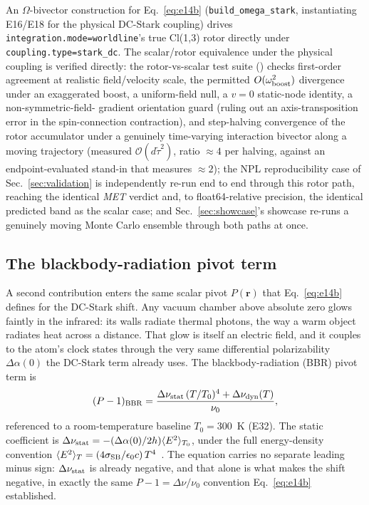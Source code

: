\documentclass[aps,pra,superscriptaddress,groupedaddress,nofootinbib]{revtex4-2}
\begin{document}
An $\Omega$-bivector construction for Eq.~\eqref{eq:e14b}
(\texttt{build\_omega\_stark}, instantiating E16/E18 for the physical
DC-Stark coupling) drives \texttt{integration.mode=worldline}'s true
Cl(1,3) rotor directly under \texttt{coupling.type=stark\_dc}. The
scalar/rotor equivalence under the physical coupling is verified
directly: the rotor-vs-scalar test suite
() checks first-order
agreement at realistic field/velocity scale, the permitted
$O(\omega_{\rm boost}^2)$ divergence under an exaggerated boost, a
uniform-field null, a $v=0$ static-node identity, a non-symmetric-field-
gradient orientation guard (ruling out an axis-transposition error in the
spin-connection contraction), and step-halving convergence of the rotor
accumulator under a genuinely time-varying interaction bivector along a
moving trajectory (measured $\mathcal{O}(d\tilde\tau^2)$, ratio
$\approx4$ per halving, against an endpoint-evaluated stand-in that
measures $\approx2$); the NPL reproducibility case of
Sec.~\ref{sec:validation} is independently re-run end to end through this
rotor path, reaching the identical \textit{MET} verdict and, to float64-relative
precision, the identical predicted band as the scalar case; and
Sec.~\ref{sec:showcase}'s showcase re-runs a genuinely moving Monte Carlo
ensemble through both paths at once.

\subsection{The blackbody-radiation pivot term}
\label{sec:bbr-pivot}

A second contribution enters the same scalar pivot $P(\mathbf{r})$ that
Eq.~\eqref{eq:e14b} defines for the DC-Stark shift. Any vacuum chamber
above absolute zero glows faintly in the infrared: its walls radiate
thermal photons, the way a warm object radiates heat across a
distance. That glow is itself an electric field, and it
couples to the atom's clock states through the very same differential
polarizability $\Delta\alpha(0)$ the DC-Stark term already uses. The
blackbody-radiation (BBR) pivot term is
\begin{equation}
  (P-1)_{\rm BBR} = \frac{\Delta\nu_{\rm stat}\,(T/T_0)^4 +
  \Delta\nu_{\rm dyn}(T)}{\nu_0} ,
  \label{eq:e32}
\end{equation}
referenced to a room-temperature baseline $T_0=300$~K (E32). The
static coefficient is $\Delta\nu_{\rm stat} =
-(\Delta\alpha(0)/2h)\langle E^2\rangle_{T_0}$, under the full
energy-density convention $\langle E^2\rangle_T = (4\sigma_{\rm
SB}/\epsilon_0 c)\,T^4$~\cite{Middelmann2012,Lisdat2021}. The equation
carries no separate leading minus sign: $\Delta\nu_{\rm stat}$ is
already negative, and that alone is what makes the shift negative, in
exactly the same $P-1=\Delta\nu/\nu_0$ convention
Eq.~\eqref{eq:e14b} established.
\end{document}

